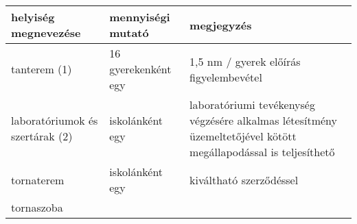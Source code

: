 \documentclass{article}
\begin{document}
\begin{longtable}[]{@{}lll@{}}
\toprule
\begin{minipage}[b]{0.13\columnwidth}\raggedright
\textbf{helyiség megnevezése}\strut
\end{minipage} & \begin{minipage}[b]{0.26\columnwidth}\raggedright
\textbf{mennyiségi mutató}\strut
\end{minipage} & \begin{minipage}[b]{0.51\columnwidth}\raggedright
\textbf{megjegyzés}\strut
\end{minipage}\tabularnewline
\midrule
\endhead
\begin{minipage}[t]{0.13\columnwidth}\raggedright
tanterem (1)\strut
\end{minipage} & \begin{minipage}[t]{0.26\columnwidth}\raggedright
16 gyerekenként egy\strut
\end{minipage} & \begin{minipage}[t]{0.51\columnwidth}\raggedright
1,5 nm / gyerek előírás figyelembevétel\strut
\end{minipage}\tabularnewline
\begin{minipage}[t]{0.13\columnwidth}\raggedright
laboratóriumok és szertárak (2)\strut
\end{minipage} & \begin{minipage}[t]{0.26\columnwidth}\raggedright
iskolánként egy\strut
\end{minipage} & \begin{minipage}[t]{0.51\columnwidth}\raggedright
laboratóriumi tevékenység végzésére alkalmas létesítmény üzemeltetőjével
kötött megállapodással is teljesíthető\strut
\end{minipage}\tabularnewline
\begin{minipage}[t]{0.13\columnwidth}\raggedright
tornaterem\strut
\end{minipage} & \begin{minipage}[t]{0.26\columnwidth}\raggedright
iskolánként egy\strut
\end{minipage} & \begin{minipage}[t]{0.51\columnwidth}\raggedright
kiváltható szerződéssel\strut
\end{minipage}\tabularnewline
\begin{minipage}[t]{0.13\columnwidth}\raggedright
tornaszoba\strut
\end{minipage} & \begin{minipage}[t]{0.26\columnwidth}\raggedright

\end{minipage}
\end{longtable}
\end{document}
